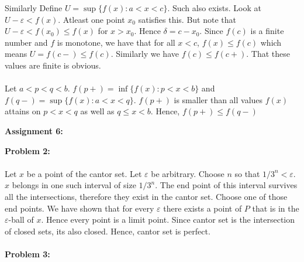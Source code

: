 \documentclass[../Main.tex]{subfiles}
\begin{document}
Similarly Define $U=\sup\{f(x):a<x<c\}$. Such also exists. Look at $U-\varepsilon<f(x)$. Atleast one point $x_0$ satisfies this. But note that $U-\varepsilon<f(x_0) \leq f(x)$ for $x>x_0$. Hence $\delta=c-x_0$. Since $f(c)$ is a finite number and $f$ is monotone, we have that for all $x<c$, $f(x)\leq f(c)$ which means $U=f(c-)\leq f(c)$. Similarly we have $f(c)\leq f(c+)$. That these values are finite is obvious. 
\\\\ Let $a<p<q<b$. $f(p+)=\inf\{f(x):p<x<b\}$ and $f(q-)=\sup\{f(x):a<x<q\}$. $f(p+)$ is smaller than all values $f(x)$ attains on $p<x<q$ as well as $q\leq x<b$. Hence, $f(p+)\leq f(q-)$
\begin{center} \textbf{Assignment 6:} \end{center}
\textbf{Problem 2:}
\\\\ Let $x$ be a point of the cantor set. Let $\varepsilon$ be arbitrary. Choose $n$ so that $1/3^n<\varepsilon$. $x$ belongs in one such interval of size $1/3^n$. The end point of this interval survives all the intersections, therefore they exist in the cantor set. Choose one of those end points. We have shown that for every $\varepsilon$ there exists a point of $P$ that is in the $\varepsilon$-ball of $x$. Hence every point is a limit point. Since cantor set is the intersection of closed sets, its also closed. Hence, cantor set is perfect. 
\\\\ \textbf{Problem 3:}
\end{document}
